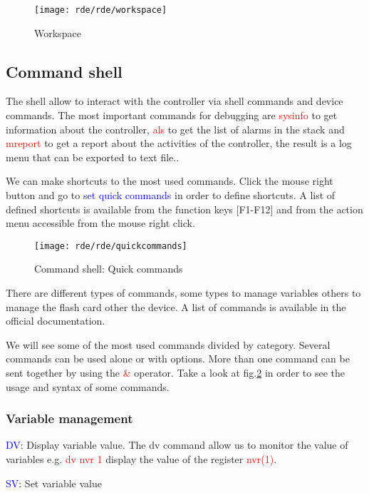 \begin{figure}
	\centering\texttt{[image: rde/rde/workspace]}
	\caption{Workspace}
	\label{figtools}
\end{figure}

\subsection{Command shell}
The shell allow to interact with the controller via shell commands and device commands.
The most important commands for debugging are \textcolor{red}{sysinfo} to get information about the controller, \textcolor{red}{als} to get the list of alarms in the stack and \textcolor{red}{mreport} to get a report about the activities of the controller, the result is a log menu that can be exported to text file..

We can make shortcuts to the most used commands. Click the mouse right button and go to \textcolor{blue}{set quick commands} in order to define shortcuts. A list of defined shortcuts is available from the function keys [F1-F12] and from the action menu accessible from the mouse right click.

\begin{figure}
	\centering\texttt{[image: rde/rde/quickcommands]}
	\caption{Command shell: Quick commands}
	\label{figquickcommands}
\end{figure}

There are different types of commands, some types to manage variables others to manage the flash card other the device. A list of commands is available in the official documentation.

We will see some of the most used commands divided by category. Several commands can be used alone or with options. More than one command can be sent together by using the \textcolor{red}{\&} operator. Take a look at fig.\ref{figquickcommands} in order to see the usage and syntax of some commands.

\subsubsection{Variable management}
\textcolor{blue}{DV}: Display variable value. The dv command allow us to monitor the value of variables e.g. \textcolor{red}{dv nvr 1} display the value of the register \textcolor{red}{nvr(1)}.

\textcolor{blue}{SV}: Set variable value

